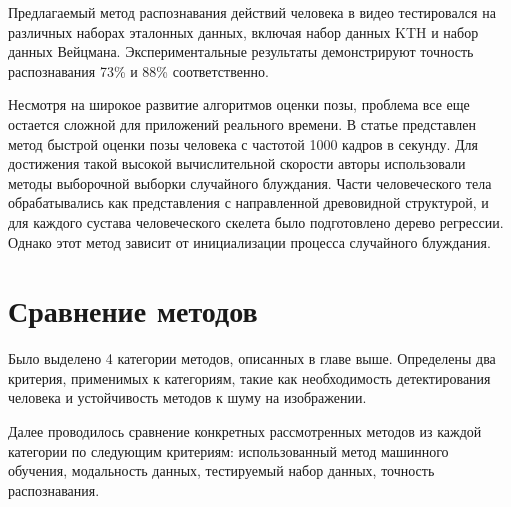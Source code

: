 Предлагаемый метод распознавания действий человека в видео тестировался на различных наборах эталонных данных, включая набор данных KTH и набор данных Вейцмана. Экспериментальные результаты демонстрируют точность распознавания 73\% и 88\% соответственно.


Несмотря на широкое развитие алгоритмов оценки позы, проблема все еще остается сложной для приложений реального времени. В статье \cite{form4} представлен метод быстрой оценки позы человека с частотой 1000 кадров в секунду. Для достижения такой высокой вычислительной скорости авторы использовали методы выборочной выборки случайного блуждания. Части человеческого тела обрабатывались как представления с направленной древовидной структурой, и для каждого сустава человеческого скелета было подготовлено дерево регрессии. Однако этот метод зависит от инициализации процесса случайного блуждания.
\section{Сравнение методов}

Было выделено 4 категории методов, описанных в главе выше. Определены два критерия, применимых к категориям, такие как необходимость детектирования человека и устойчивость методов к шуму на изображении. 

Далее проводилось сравнение конкретных рассмотренных методов из каждой категории по следующим критериям: использованный метод машинного обучения, модальность данных, тестируемый набор данных, точность распознавания.

